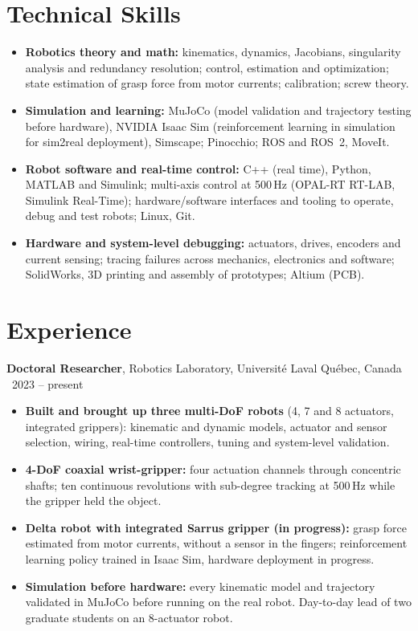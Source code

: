 \documentclass[10pt,a4paper]{article}
\newcommand{\role}[4]{\textbf{#1}, #2 \hfill {\color{muted}#3 \textbar\ #4}\par}
\begin{document}
\section{Technical Skills}
\begin{itemize}
\item \textbf{Robotics theory and math:} kinematics, dynamics, Jacobians, singularity analysis and redundancy resolution;
control, estimation and optimization; state estimation of grasp force from motor currents; calibration; screw theory.
\item \textbf{Simulation and learning:} MuJoCo (model validation and trajectory testing before hardware), NVIDIA Isaac Sim
(reinforcement learning in simulation for sim2real deployment), Simscape; Pinocchio; ROS and ROS~2, MoveIt.
\item \textbf{Robot software and real-time control:} C++ (real time), Python, MATLAB and Simulink; multi-axis control at
500\,Hz (OPAL-RT RT-LAB, Simulink Real-Time); hardware/software interfaces and tooling to operate, debug and test robots; Linux, Git.
\item \textbf{Hardware and system-level debugging:} actuators, drives, encoders and current sensing; tracing failures
across mechanics, electronics and software; SolidWorks, 3D printing and assembly of prototypes; Altium (PCB).
\end{itemize}

\section{Experience}
\role{Doctoral Researcher}{Robotics Laboratory, Universit\'e Laval}{Qu\'ebec, Canada}{2023 -- present}
\begin{itemize}
\item \textbf{Built and brought up three multi-DoF robots} (4, 7 and 8 actuators, integrated grippers): kinematic and
dynamic models, actuator and sensor selection, wiring, real-time controllers, tuning and system-level validation.
\item \textbf{4-DoF coaxial wrist-gripper:} four actuation channels through concentric shafts; ten continuous
revolutions with sub-degree tracking at 500\,Hz while the gripper held the object.
\item \textbf{Delta robot with integrated Sarrus gripper (in progress):} grasp force estimated from motor currents,
without a sensor in the fingers; reinforcement learning policy trained in Isaac Sim, hardware deployment in progress.
\item \textbf{Simulation before hardware:} every kinematic model and trajectory validated in MuJoCo before running on the
real robot. Day-to-day lead of two graduate students on an 8-actuator robot.
\end{itemize}
\end{document}
